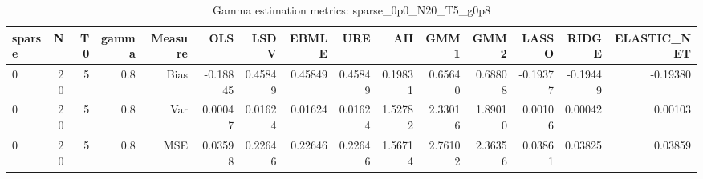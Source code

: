 \begin{table}[!htbp]\centering
\caption{Gamma estimation metrics: sparse_0p0_N20_T5_g0p8}
\label{tab:table1_sparse_0p0_N20_T5_g0p8}
\begin{tabular}{lrrrrrrrrrrrrrr}
\hline
sparse & N & T0 & gamma & Measure & OLS & LSDV & EBMLE & URE & AH & GMM1 & GMM2 & LASSO & RIDGE & ELASTIC_NET \\
\hline
0 & 20 & 5 & 0.8 & Bias & -0.18845 & 0.45849 & 0.45849 & 0.45849 & 0.19831 & 0.65640 & 0.68808 & -0.19377 & -0.19449 & -0.19380 \\
0 & 20 & 5 & 0.8 & Var & 0.00047 & 0.01624 & 0.01624 & 0.01624 & 1.52782 & 2.33016 & 1.89010 & 0.00106 & 0.00042 & 0.00103 \\
0 & 20 & 5 & 0.8 & MSE & 0.03598 & 0.22646 & 0.22646 & 0.22646 & 1.56714 & 2.76102 & 2.36356 & 0.03861 & 0.03825 & 0.03859 \\
\hline
\end{tabular}
\end{table}

